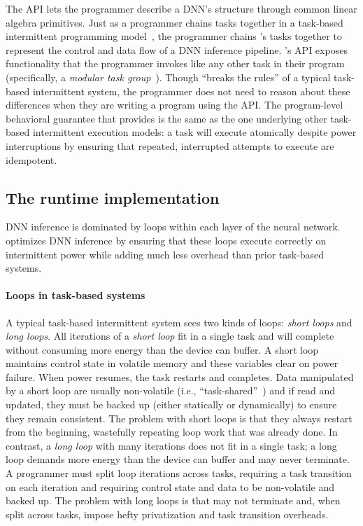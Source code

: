 The \sonic API lets the programmer describe a DNN's structure through 
common linear algebra primitives.
%
Just as a programmer chains tasks together in a task-based intermittent
programming model~\cite{chain,alpaca,mayfly}, the programmer chains \sonic's
tasks together to represent the control and data flow of a DNN inference
pipeline. 
%
\sonic's API exposes functionality that the programmer invokes like
any other task in their program (specifically, a {\em modular task
  group}~\cite{alpaca,chain}).
%
Though \sonic ``breaks the rules'' of a typical task-based
intermittent system, the programmer does not need to reason about these
differences when they are writing a program using the \sonic API.
%
The program-level behavioral guarantee that \sonic provides is the
same as the one underlying other task-based intermittent execution
models: a \sonic task will execute atomically despite power
interruptions by ensuring that repeated, interrupted attempts to
execute are idempotent.

\subsection{The \sonic runtime implementation}
\label{sonic:sonic:runtime}

DNN inference is dominated by loops within each layer of the neural network.
\sonic optimizes DNN inference by ensuring that these loops execute correctly
on intermittent power while adding much less overhead than prior task-based systems.

\paragraph{Loops in task-based systems}
A typical task-based intermittent system sees two kinds of loops: {\em short
loops} and {\em long loops}.  All iterations of a {\em short loop} fit in a
single task and will complete without consuming more energy than the device can
buffer.  A short loop maintains control state in volatile memory and these
variables clear on power failure. When power resumes, the task restarts and
completes.  Data manipulated by a short loop are usually non-volatile (i.e.,
``task-shared''~\cite{alpaca}) and if read and updated, they must be backed up
(either statically or dynamically) to ensure they remain consistent.  The
problem with short loops is that they always restart from the beginning,
wastefully repeating loop work that was already done. 
%
In contrast, a {\em long loop} with many iterations does not fit in a single
task; a long loop demands more energy than the device can buffer and may never
terminate. A programmer must split loop iterations across tasks, requiring a
task transition on each iteration and requiring control state and data to be
non-volatile and backed up.  
%
The problem with long loops is that may not terminate and, when
split across tasks, impose hefty privatization and task transition overheads.

